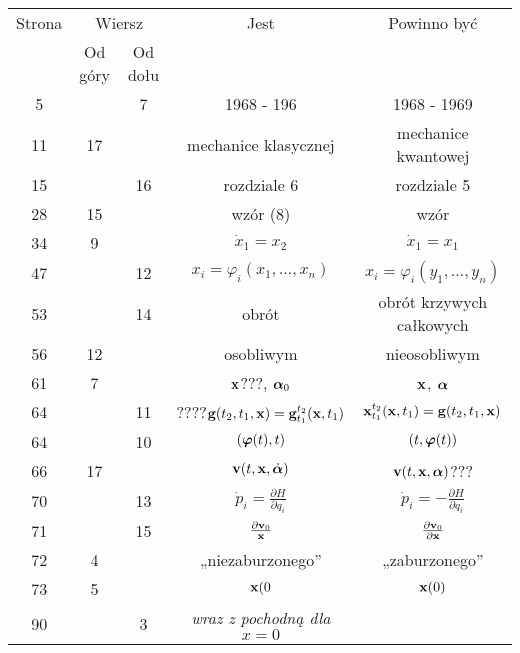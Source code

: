 \documentclass[a4paper,11pt]{article}
\begin{document}
\begin{center}

  \begin{tabular}{|c|c|c|c|c|}
    \hline
    Strona & \multicolumn{2}{c|}{Wiersz} & Jest
                              & Powinno być \\ \cline{2-3}
    & Od góry & Od dołu & & \\
    \hline
    5   & &  7 & 1968 - 196 & 1968 - 1969 \\
    11  & 17 & & mechanice klasycznej & mechanice kwantowej \\
    15  & & 16 & rozdziale 6 & rozdziale 5 \\
    28  & 15 & & wzór (8) & wzór \\
    34  &  9 & & $\dot{ x }_{ 1 } = x_{ 2 }$ & $\dot{ x }_{ 1 } = x_{ 1 }$ \\
    47  & & 12 & $x_{ i } = \varphi_{ i }( x_{ 1 }, \ldots, x_{ n } )$
           & $x_{ i } = \varphi_{ i }( y_{ 1 }, \ldots, y_{ n } )$ \\
    53  & & 14 & obrót & obrót krzywych całkowych \\
    56  & 12 & & osobliwym & nieosobliwym \\
    61  &  7 & & $\mathbf{x}$???, $\boldsymbol{\alpha}_{ 0 }$
           & $\mathbf{x}$, $\boldsymbol{\alpha}$ \\
    64  & & 11 & ????$\mathbf{g}( t_{ 2 }, t_{ 1 }, \mathbf{x} )
                = \mathbf{g}^{ t_{ 2 } }_{ t_{ 1 } }( \mathbf{x}, t_{ 1 } )$
           & $\mathbf{x}^{ t_{ 2 } }_{ t_{ 1 } }( \mathbf{x}, t_{ 1 } )
             = \mathbf{g}( t_{ 2 }, t_{ 1 }, \mathbf{x} )$ \\
    64  & & 10 & $( \boldsymbol{\varphi}( t ), t )$
           & $( t, \boldsymbol{\varphi}( t ) )$ \\[0.3em]
    66  & 17 & & $\mathbf{v}( t, \mathbf{x}, \dot{ \boldsymbol{\alpha} } )$
           & $\mathbf{v}( t, \mathbf{x}, \boldsymbol{\alpha} )$??? \\[0.3em]
    70  & & 13 & $\dot{ p }_{ i } = \frac{ \partial H }{ \partial q_{ i } }$
           & $\dot{ p }_{ i } = -\frac{ \partial H }{ \partial q_{ i } }$ \\[0.3em]
    71  & & 15 & $\frac{ \partial \mathbf{v}_{ 0 } }{ \mathbf{x} }$
           & $\frac{ \partial \mathbf{v}_{ 0 } }{ \partial \mathbf{x} }$ \\[0.4em]
    72  &  4 & & „niezaburzonego” & „zaburzonego” \\
    73  &  5 & & $\mathbf{x}( 0$ & $\mathbf{x}( 0 )$ \\
    90  & &  3 & \textit{wraz z pochodną dla} $x = 0$

\end{tabular}
\end{center}
\end{document}
